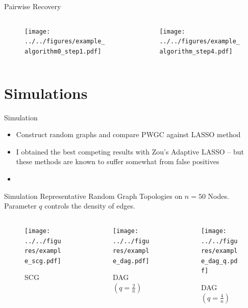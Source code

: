 \documentclass{beamer} %
\begin{document}
\begin{frame}{Pairwise Recovery}
  \begin{columns}
    \begin{column}{0.5\linewidth}
      \begin{figure}
        \texttt{[image: ../../figures/example\_algorithm0\_step1.pdf]}
      \end{figure}
    \end{column}

    \begin{column}{0.5\linewidth}
      \begin{figure}
        \texttt{[image: ../../figures/example\_algorithm\_step4.pdf]}
      \end{figure}
    \end{column}
  \end{columns}
\end{frame}

\section{Simulations}
\begin{frame}{Simulation}
  \begin{itemize}
    \item{Construct random graphs and compare PWGC against LASSO method}\pause
    \item{I obtained the best competing results with Zou's Adaptive
        LASSO -- but these methods are known to suffer somewhat from
        false positives}
    \item{}
  \end{itemize}
\end{frame}

\begin{frame}{Simulation}
  Representative Random Graph Topologies on $n = 50$ Nodes.  Parameter
  $q$ controls the density of edges.
  \begin{columns}
    \begin{column}{0.33\linewidth}
      \begin{figure}
        \caption{SCG}
        \texttt{[image: ../../figures/example\_scg.pdf]}
      \end{figure}
    \end{column}\pause
    \begin{column}{0.33\linewidth}
      \begin{figure}
        \caption{DAG $(q = \frac{2}{n})$}
        \texttt{[image: ../../figures/example\_dag.pdf]}
      \end{figure}
    \end{column}\pause
    \begin{column}{0.33\linewidth}
      \begin{figure}
        \caption{DAG $(q = \frac{4}{n})$}
        \texttt{[image: ../../figures/example\_dag\_q.pdf]}
      \end{figure}
    \end{column}
  \end{columns}
\end{frame}
\end{document}
